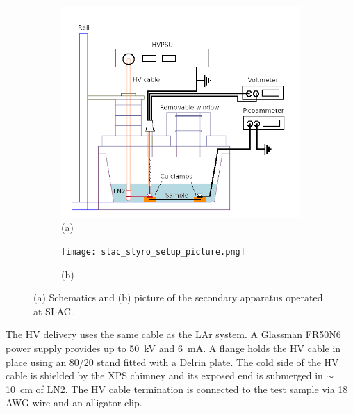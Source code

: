 \documentclass[a4paper,12pt]{article}
\begin{document}
\begin{figure}[htb]
\centering
\begin{subfigure}[c]{0.49\linewidth}
	\begin{center}
		\includegraphics[width=\linewidth]{slac_styro_setup.png}
		(a)
	\end{center}
\end{subfigure}
\begin{subfigure}[c]{0.49\linewidth}
	\begin{center}
		\vspace*{1em}
		
		\texttt{[image: slac\_styro\_setup\_picture.png]}
		\vspace*{0.5em}
		
		(b)
	\end{center}
\end{subfigure}
\caption{(a) Schematics and (b) picture of the secondary apparatus operated at SLAC.}
\label{fig:slac_styro_setup}
\end{figure}

The HV delivery uses the same cable as the LAr system. 
A Glassman FR50N6 power supply provides up to \SI{50}{\kilo\volt} and \SI{6}{\milli\ampere}.  
A flange holds the HV cable in place using an 80/20 stand fitted with a Delrin plate. 
The cold side of the HV cable is shielded by the XPS chimney and its exposed end is submerged in $\sim$\SI{10}{\centi\meter} of LN2. 
The HV cable termination is connected to the test sample via 18 AWG wire and an alligator clip.
\end{document}
